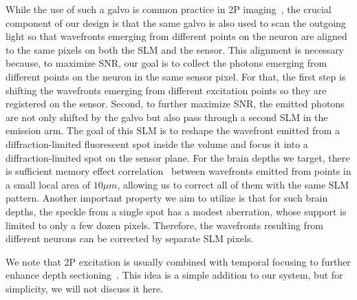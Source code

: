 While the use of such a galvo is common practice in 2P imaging~\cite{}, the crucial component of our design is that the same galvo is also used to scan the outgoing light so that wavefronts emerging from different points on the neuron are aligned to the same pixels on both the SLM and the sensor. This alignment is necessary because, to maximize SNR, our goal is to collect the photons emerging from different points on the neuron in the same sensor pixel. For that, the first step is shifting the wavefronts emerging from different excitation points so they are registered on the sensor.
Second, to further maximize SNR, the emitted photons are not only shifted by the galvo but also pass through a second SLM in the emission arm. The goal of this SLM is to reshape the wavefront emitted from a diffraction-limited fluorescent spot inside the volume and focus it into a diffraction-limited spot on the sensor plane. For the brain depths we target, there is sufficient memory effect correlation~\cite{osnabrugge2017generalized,SeeThroughSubmission,Bar:2020,Schott:15,PhysRevLett.61.834,PhysRevLett.61.2328,PhysRevE.49.4530,Fried:82,BERKOVITS1994135} between wavefronts emitted from points in a small local area of $10\mu m$, allowing us to correct all of them with the same SLM pattern. Another important property we aim to utilize is that for such brain depths, the speckle from a single spot has a modest aberration, whose support is limited to only a few dozen pixels. Therefore, the wavefronts resulting from different neurons can be corrected by separate SLM pixels.

We note that 2P excitation is usually combined with temporal focusing to further enhance depth sectioning~\cite{hernandez2016three,sun2018four,pegard2017three,mardinly2018precise,sridharan2021high}. This idea is a simple addition to our system, but for simplicity, we will not discuss it here.



